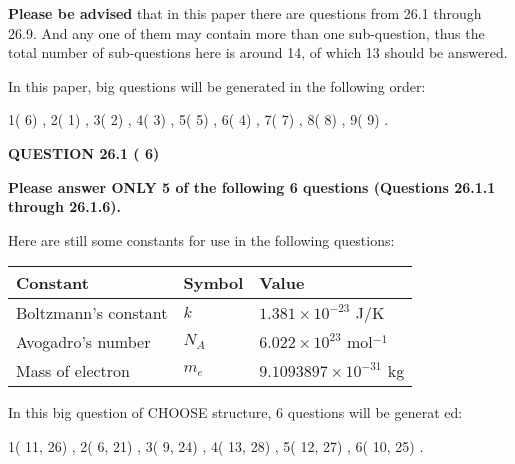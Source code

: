\documentclass[12pt]{article}
\begin{document}
 
{\textbf{\large{Please be advised}}} that in this paper there are questions from
26.1 through
26.9.
And any one of them may contain more than one sub-question, thus the total number
of sub-questions here is around 14, of which
13 should be answered.
 
\vspace{0.3in}
 
 
   
   
   
\vspace{0.2in}
   
In this paper, big questions will be generated in the following order: 
   
   
            1(          6)
 ,
            2(          1)
 ,
            3(          2)
 ,
            4(          3)
 ,
            5(          5)
 ,
            6(          4)
 ,
            7(          7)
 ,
            8(          8)
 ,
            9(          9)
 .
  
\vspace{0.2in}
  
{\textbf{\Large{QUESTION
26.1 
 (          6)
}}}
  
  
 
{\textbf{\Large{Please answer ONLY
5 of the following
6 questions (Questions
26.1.1 through
26.1.6). }}}
 
Here are still some constants for use in the following questions:
 
 
\noindent\begin{tabular}{|l|l|l|}
\hline
Constant & Symbol & Value \\
\hline
 
Boltzmann's constant &
$k$ &
 $ 1.381 \times 10^{-23} $
J/K \\
\hline
 
Avogadro's number &
$N_A$ &
 $ 6.022 \times 10^{23} $
mol$^{-1}$ \\
\hline
 
Mass of electron &
$m_e$ &
 $ 9.1093897 \times 10^{-31} $
kg \\
\hline
 
\end{tabular}
 
   
\vspace{0.2in}
   
 In this big question of CHOOSE structure,           6 questions will be generat
 ed: 
  
  
            1(         11,         26)
 ,
            2(          6,         21)
 ,
            3(          9,         24)
 ,
            4(         13,         28)
 ,
            5(         12,         27)
 ,
            6(         10,         25)
 .
  
\end{document}
